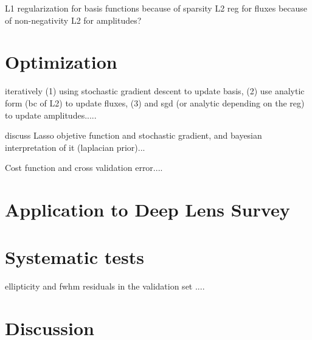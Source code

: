 \documentclass[12pt, preprint]{aastex}
\begin{document}
L1 regularization for basis functions because of sparsity
L2 reg for fluxes because of non-negativity
L2 for amplitudes?

\section{Optimization}\label{sec:opt}

iteratively (1) using stochastic gradient descent to update basis, (2) use analytic form (bc of L2)
to update fluxes, (3) and sgd (or analytic depending on the reg) to update amplitudes.....

discuss Lasso objetive function and stochastic gradient, and bayesian interpretation of it (laplacian prior)...

Cost function and cross validation error....

\section{Application to Deep Lens Survey}\label{sec:data}


\section{Systematic tests}\label{sec:sys}

ellipticity and fwhm residuals in the validation set ....

\section{Discussion}\label{sec:discussion} 
\end{document}
